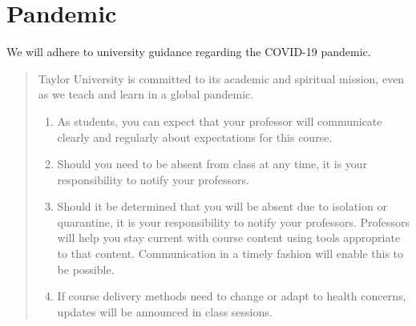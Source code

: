 \section{Pandemic}

We will adhere to university guidance regarding the COVID-19 pandemic.
\begin{quote}
  Taylor University is committed to its academic and spiritual mission,
  even as we teach and learn in a global pandemic.
  \begin{enumerate}
  \item As students, you can expect
    that your professor will communicate clearly and regularly
    about expectations for this course.
  \item 
    Should you need to be absent from class at any time,
    it is your responsibility to notify your professors.
  \item 
    Should it be determined that you will be absent due to isolation or quarantine,
    it is your responsibility to notify your professors.
    Professors will help you stay current with course content
    using tools appropriate to that content.
    Communication in a timely fashion will enable this to be possible.
  \item 
    If course delivery methods need to change or adapt to health concerns,
    updates will be announced in class sessions.
  \end{enumerate}
  
\end{quote}

